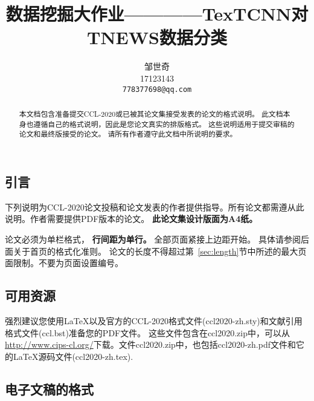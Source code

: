 \documentclass[11pt]{article}
\title{数据挖掘大作业————TexTCNN对TNEWS数据分类}
\author{邹世奇 \\
  17123143\\
  {\tt 778377698@qq.com} \\}
\date{}
\begin{document}
\begin{CJK*}{UTF8}{gbsn}
\setlength{\parindent}{2em}

\maketitle
\begin{abstract}
  本文档包含准备提交CCL-2020或已被其论文集接受发表的论文的格式说明。
  此文档本身也遵循自己的格式说明，因此是您论文真实的排版格式。
  这些说明适用于提交审稿的论文和最终版接受的论文。
  请所有作者遵守此文档中所说明的要求。
\end{abstract}

\section{引言}
\label{intro}

%
% 

下列说明为CCL-2020论文投稿和论文发表的作者提供指导。所有论文都需遵从此说明。作者需要提供PDF版本的论文。 \textbf{此论文集设计版面为A4纸。}

论文必须为单栏格式， {\bf 行间距为单行。} 
全部页面紧接上边距开始。
具体请参阅后面关于首页的格式化准则。
论文的长度不得超过第~\ref{sec:length}节中所述的最大页面限制。不要为页面设置编号。

\subsection{可用资源}

强烈建议您使用\LaTeX{}以及官方的CCL-2020格式文件(ccl2020-zh.sty)和文献引用格式文件(ccl.bst)准备您的PDF文件。
这些文件包含在ccl2020.zip中，可以从\url{http://www.cips-cl.org/}下载。文件ccl2020.zip中，也包括ccl2020-zh.pdf文件和它的\LaTeX{}源码文件(ccl2020-zh.tex). 


\subsection{电子文稿的格式}
\label{sect:pdf}


\end{CJK*}
\end{document}
